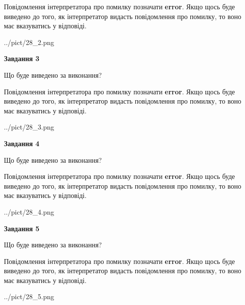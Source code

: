 \documentclass[12pt, ukrainian]{article}
\begin{document}
{\begin {large}
Повідомлення інтерпретатора про помилку позначати \textbf{error}.
Якщо щось буде виведено до того, як інтерпретатор видасть повідомлення про помилку, 
то воно має вказуватись у відповіді. \par


\begin{center}
	{../pict/28_2.png}
\end{center}
\newpage

{\begin {center}\textbf{Завдання 3}\end {center}}\par
Що буде виведено за виконання?

Повідомлення інтерпретатора про помилку позначати \textbf{error}.
Якщо щось буде виведено до того, як інтерпретатор видасть повідомлення про помилку, 
то воно має вказуватись у відповіді. \par


\begin{center}
	{../pict/28_3.png}
\end{center}
\newpage

{\begin {center}\textbf{Завдання 4}\end {center}}\par
Що буде виведено за виконання?

Повідомлення інтерпретатора про помилку позначати \textbf{error}.
Якщо щось буде виведено до того, як інтерпретатор видасть повідомлення про помилку, 
то воно має вказуватись у відповіді. \par


\begin{center}
	{../pict/28_4.png}
\end{center}
\newpage

{\begin {center}\textbf{Завдання 5}\end {center}}\par
Що буде виведено за виконання?

Повідомлення інтерпретатора про помилку позначати \textbf{error}.
Якщо щось буде виведено до того, як інтерпретатор видасть повідомлення про помилку, 
то воно має вказуватись у відповіді. \par


\begin{center}
	{../pict/28_5.png}
\end{center}
\newpage


\end{large}}
\end{document}
